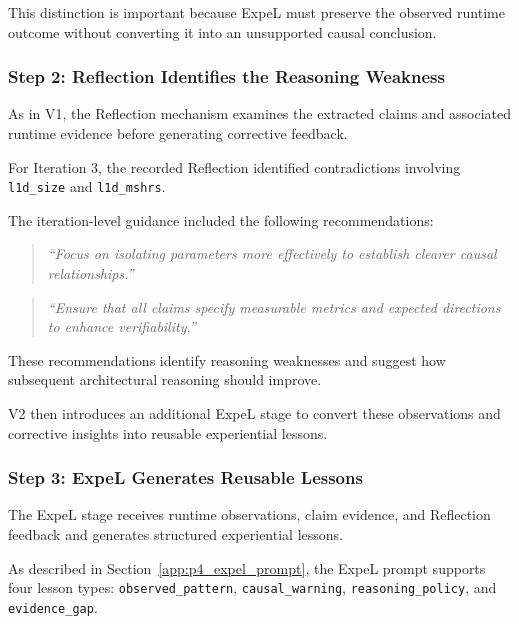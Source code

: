 This distinction is important because
ExpeL must preserve the observed runtime
outcome without converting it into an
unsupported causal conclusion.



\subsubsection{Step 2: Reflection Identifies the Reasoning Weakness}

As in V1, the Reflection mechanism examines
the extracted claims and associated runtime
evidence before generating corrective feedback.

For Iteration 3, the recorded Reflection
identified contradictions involving
\texttt{l1d\_size} and \texttt{l1d\_mshrs}.

The iteration-level guidance included
the following recommendations:

\begin{quote}
\emph{``Focus on isolating parameters more
effectively to establish clearer causal
relationships.''}
\end{quote}

\begin{quote}
\emph{``Ensure that all claims specify
measurable metrics and expected directions
to enhance verifiability.''}
\end{quote}

These recommendations identify reasoning
weaknesses and suggest how subsequent
architectural reasoning should improve.

V2 then introduces an additional ExpeL stage
to convert these observations and corrective
insights into reusable experiential lessons.



\subsubsection{Step 3: ExpeL Generates Reusable Lessons}

The ExpeL stage receives runtime observations,
claim evidence, and Reflection feedback and
generates structured experiential lessons.

As described in
Section~\ref{app:p4_expel_prompt},
the ExpeL prompt supports four lesson types:
\texttt{observed\_pattern},
\texttt{causal\_warning},
\texttt{reasoning\_policy}, and
\texttt{evidence\_gap}.

